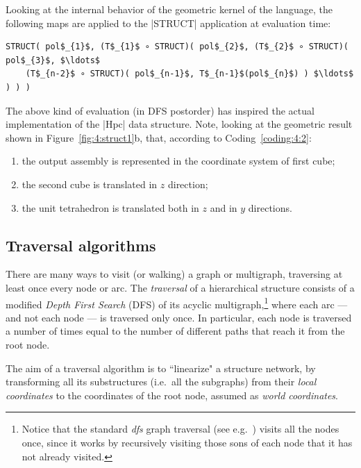 \begin{coding}
Looking at the internal behavior of the geometric kernel of the
language, the following maps are applied to the |STRUCT|
application at evaluation time:

\begin{lstlisting}[language=JuliaLocal, style=julia, mathescape=true]
STRUCT( pol$_{1}$, (T$_{1}$ ∘ STRUCT)( pol$_{2}$, (T$_{2}$ ∘ STRUCT)( pol$_{3}$, $\ldots$ 
	(T$_{n-2}$ ∘ STRUCT)( pol$_{n-1}$, T$_{n-1}$(pol$_{n}$) ) $\ldots$ ) ) )
\end{lstlisting}

The above kind of evaluation (in DFS postorder) has inspired the actual implementation of the |Hpc| data structure.
Note, looking at the geometric result shown in
Figure~\ref{fig:4:struct1}b, that, according to Coding~\ref{coding:4:2}:
\begin{enumerate}
    \item
the output assembly is
represented in the coordinate system of first cube; 
    \item
the second cube is translated in $z$ direction; 
    \item
the unit tetrahedron is translated both in $z$ and in $y$ directions.
\end{enumerate}


\subsection*{Traversal algorithms}\label{sect:4-3-3}

There are many ways to visit (or walking) a graph or multigraph, traversing at least once every node or arc.
The \emph{traversal} of a hierarchical structure consists of a 
modified
\emph{Depth First Search} (DFS) of its acyclic multigraph,\footnote{
Notice that the standard \emph{dfs} graph traversal (see 
e.g.~\cite{AhoHopcroftUllman:DSA}) visits all the nodes once, since it works by
recursively visiting those sons of each node that it has not already 
visited. }
where each arc --- and not each node --- is traversed only once.  
In particular, each node is traversed a number of times equal to the
number of different paths that reach it from the root node.

The aim of a traversal algorithm is to ``linearize" a 
structure network, by transforming all its substructures (i.e.~all the
subgraphs) from their \emph{local coordinates} to the coordinates of
the root node, assumed as \emph{world coordinates}.


\end{coding}
